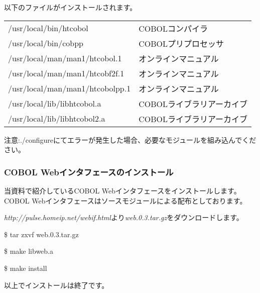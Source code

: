 \begin{itemize}
以下のファイルがインストールされます。

\begin{tabular}{ll}
/usr/local/bin/htcobol            &COBOLコンパイラ\\
/usr/local/bin/cobpp              &COBOLプリプロセッサ\\
/usr/local/man/man1/htcobol.1     &オンラインマニュアル\\
/usr/local/man/man1/htcobf2f.1    &オンラインマニュアル\\
/usr/local/man/man1/htcobolpp.1   &オンラインマニュアル\\
/usr/local/lib/libhtcobol.a       &COBOLライブラリアーカイブ\\
/usr/local/lib/libhtcobol2.a      &COBOLライブラリアーカイブ\\
\end{tabular}

注意:./configureにてエラーが発生した場合、必要なモジュールを組み込んでください。

\end{itemize}

\subsubsection{COBOL Webインタフェースのインストール}

当資料で紹介しているCOBOL Webインタフェースをインストールします。
COBOL Webインタフェースはソースモジュールによる配布としております。

{\it http://pulse.homeip.net/webif.html}より{\it web.0.3.tar.gz}をダウンロードします。

\$ tar zxvf web.0.3.tar.gz

\$ make libweb.a

\$ make install

以上でインストールは終了です。






